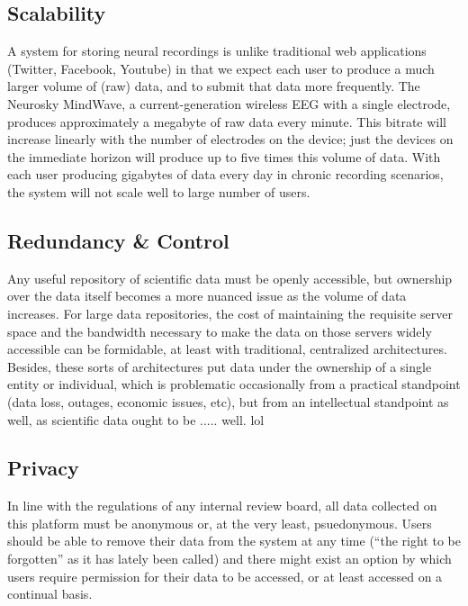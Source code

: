 \documentclass[a4paper,twoside]{article}
\begin{document}
\subsection{Scalability}

A system for storing neural recordings is unlike traditional web applications (Twitter, Facebook, Youtube) in that we expect each user to produce a much larger volume of (raw) data, and to submit that data more frequently. The Neurosky MindWave, a current-generation wireless EEG with a single electrode, produces approximately a megabyte of raw data every minute. This bitrate will increase linearly with the number of electrodes on the device; just the devices on the immediate horizon will produce up to five times this volume of data. With each user producing gigabytes of data every day in chronic recording scenarios, the system will not scale well to large number of users.

\subsection{Redundancy \& Control}

Any useful repository of scientific data must be openly accessible, but ownership over the data itself becomes a more nuanced issue as the volume of data increases. For large data repositories, the cost of maintaining the requisite server space and the bandwidth necessary to make the data on those servers widely accessible can be formidable, at least with traditional, centralized architectures. Besides, these sorts of architectures put data under the ownership of a single entity or individual, which is problematic occasionally from a practical standpoint (data loss, outages, economic issues, etc), but from an intellectual standpoint as well, as scientific data ought to be ..... well. lol

\subsection{Privacy}

In line with the regulations of any internal review board, all data collected on this platform must be anonymous or, at the very least, psuedonymous. Users should be able to remove their data from the system at any time (``the right to be forgotten'' as it has lately been called) and there might exist an option by which users require permission for their data to be accessed, or at least accessed on a continual basis.
\end{document}
